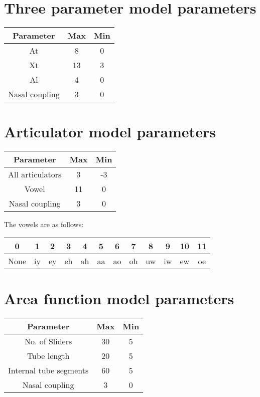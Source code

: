 \section{Three parameter model parameters}
\begin{center}
\begin{tabular}{|c|c|c|}
\hline Parameter  & Max & Min  \\ \hline At & 8 & 0 \\ \hline Xt &
13 & 3 \\ \hline Al & 4 & 0 \\ \hline Nasal coupling & 3 & 0 \\
\hline
\end{tabular}
\end{center}

\section{Articulator model parameters}
\begin{center}
\begin{tabular}{|c|c|c|}
\hline Parameter  & Max & Min  \\ \hline All articulators  & 3 &
-3
\\ \hline
Vowel & 11 & 0\\ \hline Nasal coupling  & 3 & 0 \\ \hline
\end{tabular}
\end{center}
The vowels are as follows:
\begin{center}
\begin{tabular} {|c|c|c|c|c|c|c|c|c|c|c|c|}
\hline 0 & 1 & 2 & 3 & 4 & 5 & 6 & 7 & 8 & 9 & 10 & 11 \\ \hline
None & iy & ey & eh & ah & aa & ao & oh & uw & iw & ew & oe \\
\hline
\end{tabular}
\end{center}


\section{Area function model parameters}
\begin{center}
\begin{tabular}{|c|c|c|}
\hline Parameter  & Max & Min  \\ \hline No. of Sliders  & 30 & 5
\\ \hline
Tube length  & 20 & 5 \\ \hline Internal tube segments  & 60 & 5
\\ \hline
Nasal coupling & 3 & 0 \\ \hline
\end{tabular}
\end{center}
